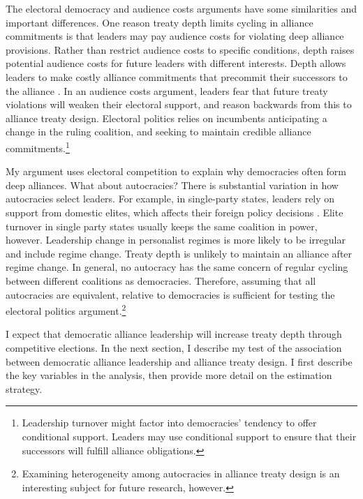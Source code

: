 \documentclass[12pt]{article}
\begin{document}
The electoral democracy and audience costs arguments have some similarities and important differences. 
One reason treaty depth limits cycling in alliance commitments is that leaders may pay audience costs for violating deep alliance provisions. 
Rather than restrict audience costs to specific conditions, depth raises potential audience costs for future leaders with different interests. 
Depth allows leaders to make costly alliance commitments that precommit their successors to the alliance \citep{Mattes2012a}. 
In an audience costs argument, leaders fear that future treaty violations will weaken their electoral support, and reason backwards from this to alliance treaty design. 
Electoral politics relies on incumbents anticipating a change in the ruling coalition, and seeking to maintain credible alliance commitments.\footnote{Leadership turnover might factor into democracies' tendency to offer conditional support. Leaders may use conditional support to ensure that their successors will fulfill alliance obligations.} 


My argument uses electoral competition to explain why democracies often form deep alliances. 
What about autocracies? 
There is substantial variation in how autocracies select leaders. 
For example, in single-party states, leaders rely on support from domestic elites, which affects their foreign policy decisions \citep{Weeks2014}.
Elite turnover in single party states usually keeps the same coalition in power, however.  
Leadership change in personalist regimes is more likely to be irregular and include regime change.
Treaty depth is unlikely to maintain an alliance after regime change.  
In general, no autocracy has the same concern of regular cycling between different coalitions as democracies.
Therefore, assuming that all autocracies are equivalent, relative to democracies is sufficient for testing the electoral politics argument.\footnote{Examining heterogeneity among autocracies in alliance treaty design is an interesting subject for future research, however.} 


I expect that democratic alliance leadership will increase treaty depth through competitive elections. 
In the next section, I describe my test of the association between democratic alliance leadership and alliance treaty design. 
I first describe the key variables in the analysis, then provide more detail on the estimation strategy.
\end{document}
